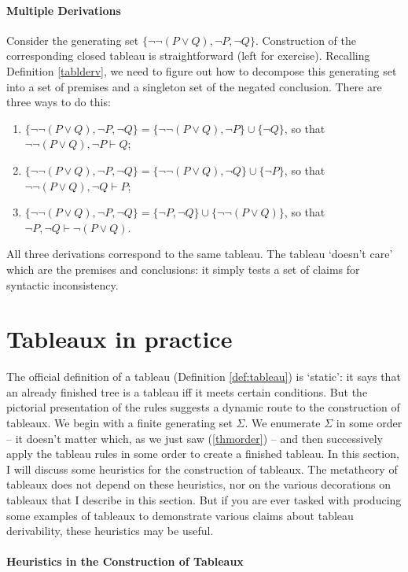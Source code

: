 \paragraph{Multiple Derivations} Consider the generating set $\{¬¬(P\vee Q),¬P,¬Q\}$\label{tabl6ex}. Construction of the corresponding closed tableau is straightforward (left for exercise). Recalling Definition \ref{tablderv}, we need to figure out how to decompose this generating set into a set of premises and a singleton set of the negated conclusion. There are three ways to do this: \begin{enumerate}
	\item $\{¬¬(P\vee Q),¬P,¬Q\} = \{¬¬(P \vee Q), ¬P\} \cup \{¬Q\}$, so that $¬¬(P\vee Q), ¬P \vdash Q$;
	\item $\{¬¬(P\vee Q),¬P,¬Q\} = \{¬¬(P \vee Q), ¬Q\} \cup \{¬P\}$, so that $¬¬(P\vee Q), ¬Q \vdash P$;
	\item $\{¬¬(P\vee Q),¬P,¬Q\} = \{¬P, ¬Q\} \cup \{¬¬(P \vee Q)\}$, so that $¬P, ¬Q \vdash ¬(P \vee Q)$.
\end{enumerate} All three derivations correspond to the same tableau. The tableau `doesn't care' which are the premises and conclusions: it simply tests a set of claims for syntactic inconsistency. 



\section{Tableaux in practice}

The official definition of a tableau (Definition \ref{def:tableau}) is `static': it says that an already finished tree is a tableau iff it meets certain conditions. But the pictorial presentation of the rules suggests a dynamic route to the construction of tableaux. We begin with a finite generating set $\Sigma$. We enumerate $\Sigma$ in some order – it doesn't matter which, as we just saw (\autoref{thmorder})  – and then successively apply the tableau rules in some order to create a finished tableau. In this section, I will discuss some heuristics for the construction of tableaux. The metatheory of tableaux does not depend on these heuristics, nor on the various decorations on tableaux that I describe in this section. But if you are ever tasked with producing some examples of tableaux to demonstrate various claims about tableau derivability, these heuristics may be useful.

\paragraph{Heuristics in the Construction of Tableaux} 

